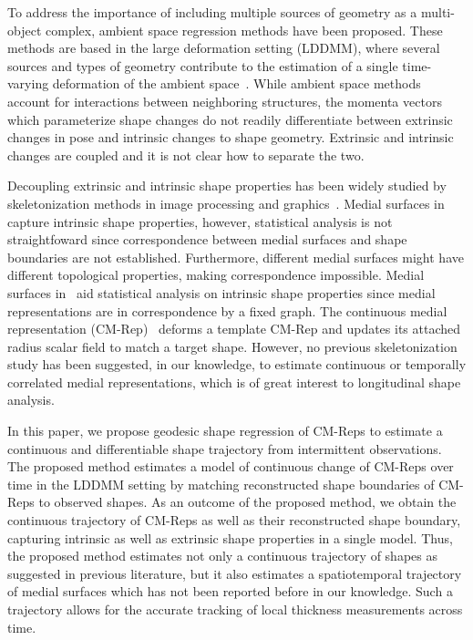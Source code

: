 \documentclass{llncs}
\begin{document}
To address the importance of including multiple sources of geometry as a multi-object complex, ambient space regression methods have been proposed. These methods are based in the large deformation setting (LDDMM), where several sources and types of geometry contribute to the estimation of a single time-varying deformation of the ambient space~\cite{Rekik2016, Fishbaugh2013}. While ambient space methods account for interactions between neighboring structures, the momenta vectors which parameterize shape changes do not readily differentiate between extrinsic changes in pose and intrinsic changes to shape geometry. Extrinsic and intrinsic changes are coupled and it is not clear how to separate the two.

Decoupling extrinsic and intrinsic shape properties has been widely studied by skeletonization methods in image processing and graphics~\cite{Taglia2016}. Medial surfaces in~\cite{Siddiqi2002} capture intrinsic shape properties, however, statistical analysis is not straightfoward since correspondence between medial surfaces and shape boundaries are not established. Furthermore, different medial surfaces might have different topological properties, making correspondence impossible. Medial surfaces in~\cite{Pizer2003} aid statistical analysis on intrinsic shape properties since medial representations are in correspondence by a fixed graph. The continuous medial representation (CM-Rep)~\cite{Yushkevich2006} deforms a template CM-Rep and updates its attached radius scalar field to match a target shape. However, no previous skeletonization study has been suggested, in our knowledge, to estimate continuous or temporally correlated medial representations, which is of great interest to longitudinal shape analysis.

In this paper, we propose geodesic shape regression of CM-Reps to estimate a continuous and differentiable shape trajectory from intermittent observations. The proposed method estimates a model of continuous change of CM-Reps over time in the LDDMM setting by matching reconstructed shape boundaries of CM-Reps to observed shapes. As an outcome of the proposed method, we obtain the continuous trajectory of CM-Reps as well as their reconstructed shape boundary, capturing intrinsic as well as extrinsic shape properties in a single model. Thus, the proposed method estimates not only a continuous trajectory of shapes as suggested in previous literature, but it also estimates a spatiotemporal trajectory of medial surfaces which has not been reported before in our knowledge. Such a trajectory allows for the accurate tracking of local thickness measurements across time.
\end{document}
